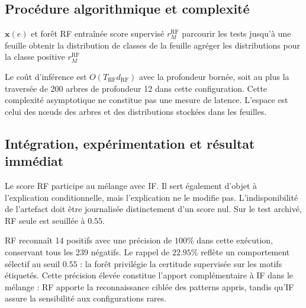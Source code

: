 \documentclass[11pt,a4paper,oneside]{report}
\theoremstyle{definition}
\theoremstyle{plain}
\begin{document}
\subsection*{Procédure algorithmique et complexité}

\begin{algorithm}[H]
\caption{Inférence supervisée par forêt aléatoire}
\label{alg:ai-ro-rf}
\begin{algorithmic}[1]
\Require $\mathbf{x}(e)$ et forêt RF entraînée
\Ensure score supervisé $r_M^{\mathrm{RF}}$
  \State parcourir les tests jusqu'à une feuille
  \State obtenir la distribution de classes de la feuille
\EndFor
\State agréger les distributions pour la classe positive
\State \Return $r_M^{\mathrm{RF}}$
\end{algorithmic}
\end{algorithm}

Le coût d'inférence est $O(T_{\mathrm{RF}}d_{\mathrm{RF}})$ avec la profondeur bornée, soit au plus la traversée de 200 arbres de profondeur 12 dans cette configuration. Cette complexité asymptotique ne constitue pas une mesure de latence. L'espace est celui des nœuds des arbres et des distributions stockées dans les feuilles.

\subsection*{Intégration, expérimentation et résultat immédiat}

Le score RF participe au mélange avec IF. Il sert également d'objet à l'explication conditionnelle, mais l'explication ne le modifie pas. L'indisponibilité de l'artefact doit être journalisée distinctement d'un score nul. Sur le test archivé, RF seule est seuillée à $0.55$.

\begin{table}[H]
\centering
\caption{Résultat archivé de RF, $n=300$, seuil $0.55$.}
\label{tab:method-rf-results}
\small
{}
\end{table}

RF reconnaît 14 positifs avec une précision de $100\%$ dans cette exécution,
conservant tous les 239 négatifs. Le rappel de $22.95\%$ reflète un
comportement sélectif au seuil $0.55$ : la forêt privilégie la certitude
supervisée sur les motifs étiquetés. Cette précision élevée constitue l'apport
complémentaire à IF dans le mélange : RF apporte la reconnaissance ciblée des
patterns appris, tandis qu'IF assure la sensibilité aux configurations rares.
\end{document}
